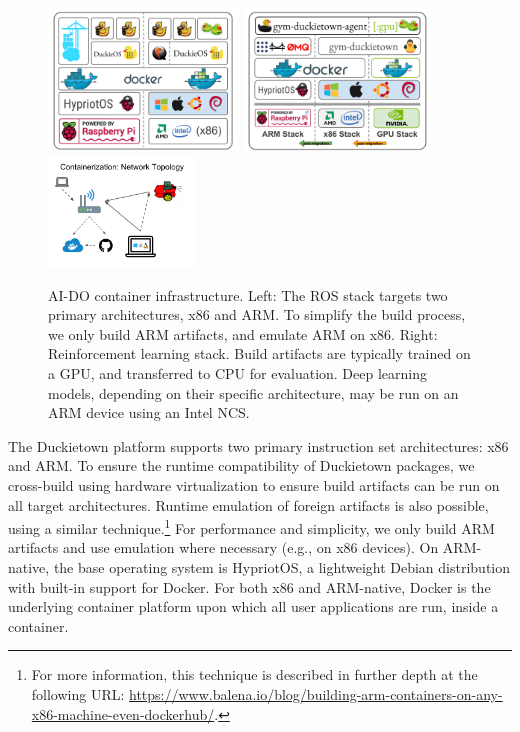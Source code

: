 \documentclass[12pt,initial,twoside,maitrise]{dms}
\numberwithin{equation}{section}
\numberwithin{table}{chapter}
\numberwithin{figure}{chapter}
\begin{document}
\begin{figure}[ht]
    \centering
    \includegraphics[width=0.45\textwidth]{docker_stack_1.png}
    \includegraphics[width=0.45\textwidth]{docker_stack_2.png}
    \includegraphics[width=0.35\textwidth]{network_infra.png}
    \caption{AI-DO container infrastructure. Left: The ROS stack targets two primary architectures, x86 and ARM. To simplify the build process, we only build ARM artifacts, and emulate ARM on x86. Right: Reinforcement learning stack. Build artifacts are typically trained on a GPU, and transferred to CPU for evaluation. Deep learning models, depending on their specific architecture, may be run on an ARM device using an Intel NCS.}
    \label{fig:docker}
\end{figure}

The Duckietown platform supports two primary instruction set architectures: x86 and ARM. To ensure the runtime compatibility of Duckietown packages, we cross-build using hardware virtualization to ensure build artifacts can be run on all target architectures. Runtime emulation of foreign artifacts is also possible, using a similar technique.\footnote{For more information, this technique is described in further depth at the following URL: \url{https://www.balena.io/blog/building-arm-containers-on-any-x86-machine-even-dockerhub/}.} For performance and simplicity, we only build ARM artifacts and use emulation where necessary (e.g., on x86 devices). On ARM-native, the base operating system is HypriotOS, a lightweight Debian distribution with built-in support for Docker. For both x86 and ARM-native, Docker is the underlying container platform upon which all user applications are run, inside a container.
\end{document}
